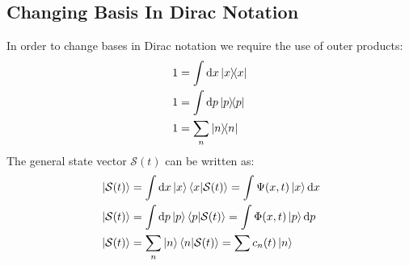 \subsection{Changing Basis In Dirac Notation}
In order to change bases in Dirac notation we require the use of outer products:
\begin{align*}
  1&=\int\dd{x}\dyad{x}{x}\\
  1&=\int\dd{p}\dyad{p}{p}\\
  1&=\sum_{n}\dyad{n}{n}
\end{align*}
The general state vector $\mathcal{S}(t)$ can be written as:
\begin{align*}
  &\ket{\mathcal{S}(t)}=\int\dd{x}\ket{x}\braket{x}{\mathcal{S}(t)}=
  \int\Psi(x,t)\ket{x}\dd{x}\\
  &\ket{\mathcal{S}(t)}=\int\dd{p}\ket{p}\braket{p}{\mathcal{S}(t)}=
  \int\Phi(x,t)\ket{p}\dd{p}\\
  &\ket{\mathcal{S}(t)}=\sum_{n}\ket{n}\braket{n}{\mathcal{S}(t)}=
  \sum c_n(t)\ket{n}
\end{align*}